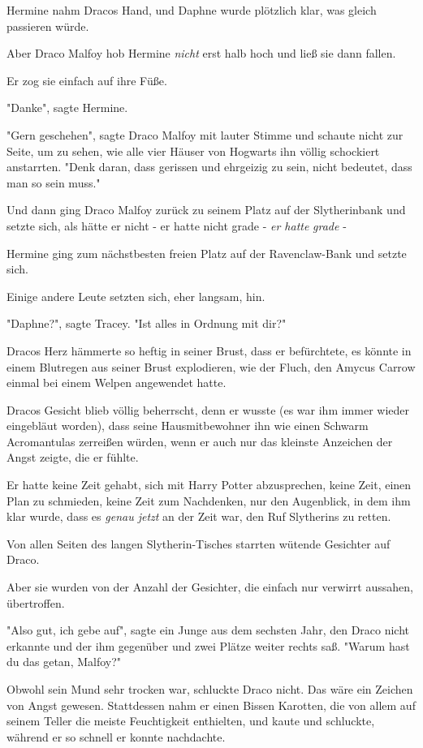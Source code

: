{Hermine nahm Dracos Hand, und Daphne wurde plötzlich klar, was gleich passieren würde.

Aber Draco Malfoy hob Hermine \emph{nicht} erst halb hoch und ließ sie dann fallen.

Er zog sie einfach auf ihre Füße.

"Danke", sagte Hermine.

"Gern geschehen", sagte Draco Malfoy mit lauter Stimme und schaute nicht zur Seite, um zu sehen, wie alle vier Häuser von Hogwarts ihn völlig schockiert anstarrten. "Denk daran, dass gerissen und ehrgeizig zu sein, nicht bedeutet, dass man so sein muss."

Und dann ging Draco Malfoy zurück zu seinem Platz auf der Slytherinbank und setzte sich, als hätte er nicht - er hatte nicht grade - \emph{er hatte} \emph{grade} -

Hermine ging zum nächstbesten freien Platz auf der Ravenclaw-Bank und setzte sich.

Einige andere Leute setzten sich, eher langsam, hin.

"Daphne?", sagte Tracey. "Ist alles in Ordnung mit dir?"

Dracos Herz hämmerte so heftig in seiner Brust, dass er befürchtete, es könnte in einem Blutregen aus seiner Brust explodieren, wie der Fluch, den Amycus Carrow einmal bei einem Welpen angewendet hatte.

Dracos Gesicht blieb völlig beherrscht, denn er wusste (es war ihm immer wieder eingebläut worden), dass seine Hausmitbewohner ihn wie einen Schwarm Acromantulas zerreißen würden, wenn er auch nur das kleinste Anzeichen der Angst zeigte, die er fühlte.

Er hatte keine Zeit gehabt, sich mit Harry Potter abzusprechen, keine Zeit, einen Plan zu schmieden, keine Zeit zum Nachdenken, nur den Augenblick, in dem ihm klar wurde, dass es \emph{genau jetzt} an der Zeit war, den Ruf Slytherins zu retten.

Von allen Seiten des langen Slytherin-Tisches starrten wütende Gesichter auf Draco.

Aber sie wurden von der Anzahl der Gesichter, die einfach nur verwirrt aussahen, übertroffen.

"Also gut, ich gebe auf", sagte ein Junge aus dem sechsten Jahr, den Draco nicht erkannte und der ihm gegenüber und zwei Plätze weiter rechts saß. "Warum hast du das getan, Malfoy?"

Obwohl sein Mund sehr trocken war, schluckte Draco nicht. Das wäre ein Zeichen von Angst gewesen. Stattdessen nahm er einen Bissen Karotten, die von allem auf seinem Teller die meiste Feuchtigkeit enthielten, und kaute und schluckte, während er so schnell er konnte nachdachte.

}
